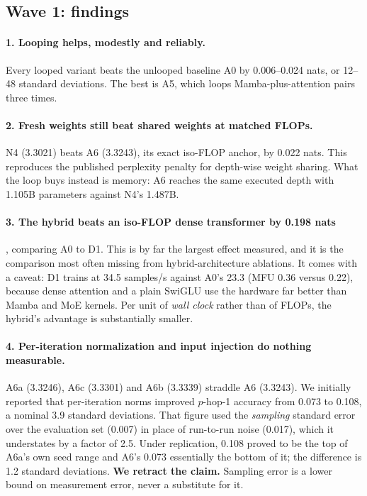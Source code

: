 \documentclass[11pt,a4paper]{article}
\begin{document}
\subsection{Wave 1: findings}

\paragraph{1. Looping helps, modestly and reliably.} Every looped variant beats the unlooped
baseline A0 by 0.006--0.024 nats, or 12--48 standard deviations. The best is A5, which loops
Mamba-plus-attention pairs three times.

\paragraph{2. Fresh weights still beat shared weights at matched FLOPs.} N4 (3.3021) beats A6
(3.3243), its exact iso-FLOP anchor, by 0.022 nats. This reproduces the published perplexity
penalty for depth-wise weight sharing. What the loop buys instead is memory: A6 reaches the same
executed depth with 1.105B parameters against N4's 1.487B.

\paragraph{3. The hybrid beats an iso-FLOP dense transformer by 0.198 nats}, comparing A0 to D1.
This is by far the largest effect measured, and it is the comparison most often missing from
hybrid-architecture ablations. It comes with a caveat: D1 trains at 34.5 samples/s against A0's
23.3 (MFU 0.36 versus 0.22), because dense attention and a plain SwiGLU use the hardware far better
than Mamba and MoE kernels. Per unit of \emph{wall clock} rather than of FLOPs, the hybrid's
advantage is substantially smaller.

\paragraph{4. Per-iteration normalization and input injection do nothing measurable.} A6a
(3.3246), A6c (3.3301) and A6b (3.3339) straddle A6 (3.3243). We initially reported that
per-iteration norms improved $p$-hop-1 accuracy from 0.073 to 0.108, a nominal 3.9 standard
deviations. That figure used the \emph{sampling} standard error over the evaluation set (0.007) in
place of run-to-run noise (0.017), which it understates by a factor of 2.5. Under replication,
0.108 proved to be the top of A6a's own seed range and A6's 0.073 essentially the bottom of it; the
difference is 1.2 standard deviations. \textbf{We retract the claim.} Sampling error is a lower
bound on measurement error, never a substitute for it.
\end{document}
